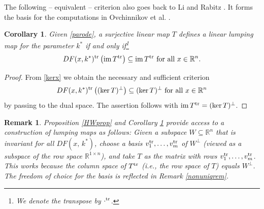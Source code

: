 \documentclass{article}
\newtheorem{remark}{Remark}
\newtheorem{corollary}{Corollary}
\begin{document}
The following -- equivalent -- criterion also goes back to Li and Rabitz \cite{LR1989}. It forms the basis for the computations in Ovchinnikov et al. \cite{OVPT2021}.
\begin{corollary}\label{HWcor}
Given \eqref{parode}, a surjective linear map $T$ defines a linear lumping map for the parameter $k^*$ if and only if\footnote{We denote the transpose by $\cdot ^{\rm tr}$.}
\begin{equation}\label{kerxtrans}
DF(x,k^*)^{\rm{tr}}\left({\rm im}\, T^{\rm tr}\right)\subseteq {\rm im}\, T^{\rm tr}\text{  for all  }x\in\mathbb R^n.
\end{equation}
\end{corollary}
\begin{proof}
From \eqref{kerx} we obtain the necessary and sufficient criterion
\begin{equation*}
DF(x,k^*)^{\rm tr}\left((\ker T)^\perp\right)\subseteq (\ker T)^\perp \text{  for all  }x\in\mathbb R^n
\end{equation*}
by passing to the dual space. The assertion follows with ${\rm im}\,T^{\rm tr}=(\ker T)^\perp$.
\end{proof}
\begin{remark}\label{rem:construct} {\em 
Proposition \ref{HWprop} and Corollary \ref{HWcor} provide access to a construction of lumping maps as follows: Given a subspace $W\subseteq \mathbb R^n$ that is invariant for all $DF(x,\,k^*)$, choose a basis $v_1^{\rm tr},\ldots, v_m^{\rm tr}$ of $W^\perp$  (viewed as a subspace of the row space $\mathbb R^{1\times n}$), and take $T$ as the matrix with rows $v_1^{\rm tr},\ldots, v_m^{\rm tr}$. This works because the column space of $T^{\rm tr}$ (i.e., the row space of $T$) equals $W^\perp$. The freedom of choice for the basis is reflected in Remark \ref{nonuniqrem}.}
\end{remark}
\end{document}
